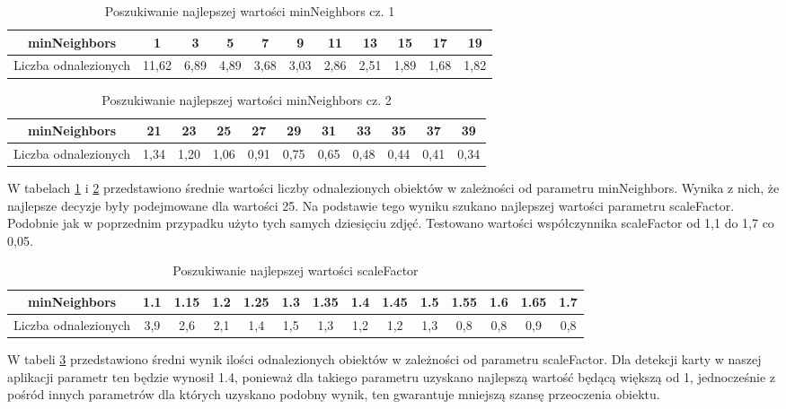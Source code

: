\begin{table}[H]
    \caption{Poszukiwanie najlepszej wartości minNeighbors cz. 1}
    \label{tab:somsiadyNaj1}
    \begin{tabular}{|c|c|c|c|c|c|c|c|c|c|c|}
\hline
minNeighbors & 1 & 3 & 5 & 7 & 9 & 11 & 13 & 15 & 17 & 19\\
\hline
Liczba odnalezionych & 11,62 & 6,89 & 4,89 & 3,68 & 3,03 & 2,86 & 2,51 & 1,89 & 1,68 & 1,82 \\
\hline
\end{tabular}
\end{table}

\begin{table}[H]
    \caption{Poszukiwanie najlepszej wartości minNeighbors cz. 2}
    \label{tab:somsiadyNaj2}
    \begin{tabular}{|c|c|c|c|c|c|c|c|c|c|c|}
\hline
minNeighbors & 21 & 23 & 25 & 27 & 29 & 31 & 33 & 35 & 37 & 39\\
\hline
Liczba odnalezionych &  1,34 & 1,20 & 1,06 & 0,91 & 0,75 & 0,65 & 0,48 & 0,44 & 0,41 & 0,34\\
\hline
\end{tabular}
\end{table}

W tabelach \ref{tab:somsiadyNaj1} i \ref{tab:somsiadyNaj2} przedstawiono średnie wartości liczby odnalezionych obiektów w zależności od parametru minNeighbors. Wynika z nich, że najlepsze decyzje były podejmowane dla wartości 25.
Na podstawie tego wyniku szukano najlepszej wartości parametru scaleFactor. Podobnie jak w poprzednim przypadku użyto tych samych dziesięciu zdjęć. Testowano wartości współczynnika scaleFactor od 1,1 do 1,7 co 0,05.

\begin{table}[H]
    \caption{Poszukiwanie najlepszej wartości scaleFactor}
    \label{tab:ckalaNaj}
    \begin{tabular}{|c|c|c|c|c|c|c|c|c|c|c|c|c|c|}
\hline
minNeighbors & 1.1 & 1.15 & 1.2 & 1.25 & 1.3 & 1.35 & 1.4 & 1.45 & 1.5 & 1.55 & 1.6 & 1.65 & 1.7\\
\hline
Liczba odnalezionych & 3,9 & 2,6 & 2,1 & 1,4 & 1,5 & 1,3 & 1,2 & 1,2 & 1,3 & 0,8 & 0,8 & 0,9& 0,8\\
\hline
\end{tabular}
\end{table}

W tabeli \ref{tab:ckalaNaj} przedstawiono średni wynik ilości odnalezionych obiektów w zależności od parametru scaleFactor. Dla detekcji karty w naszej aplikacji parametr ten będzie wynosił 1.4, ponieważ dla takiego parametru uzyskano najlepszą wartość będącą większą od 1, jednocześnie z pośród innych parametrów dla których uzyskano podobny wynik, ten gwarantuje mniejszą szansę przeoczenia obiektu.

